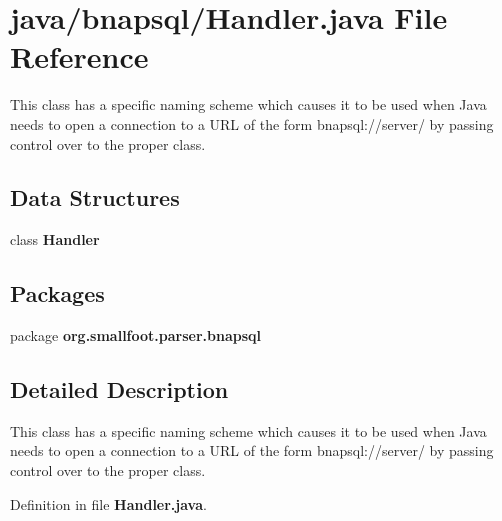 \section{java/bnapsql/\+Handler.java File Reference}
\label{bnapsql_2Handler_8java}


This class has a specific naming scheme which causes it to be used when Java needs to open a connection to a U\+R\+L of the form bnapsql\+://server/ by passing control over to the proper class.  


\subsection*{Data Structures}
\begin{DoxyCompactItemize}
\item 
class {\bf Handler}
\end{DoxyCompactItemize}
\subsection*{Packages}
\begin{DoxyCompactItemize}
\item 
package {\bf org.\+smallfoot.\+parser.\+bnapsql}
\end{DoxyCompactItemize}


\subsection{Detailed Description}
This class has a specific naming scheme which causes it to be used when Java needs to open a connection to a U\+R\+L of the form bnapsql\+://server/ by passing control over to the proper class. 



Definition in file {\bf Handler.\+java}.

